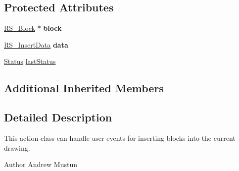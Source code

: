 \subsection*{Protected Attributes}
\begin{DoxyCompactItemize}
\item 
\hypertarget{classRS__ActionBlocksInsert_ad95c23f83966dd927d4a9e2f07f60eb1}{\hyperlink{classRS__Block}{R\-S\-\_\-\-Block} $\ast$ {\bfseries block}}\label{classRS__ActionBlocksInsert_ad95c23f83966dd927d4a9e2f07f60eb1}

\item 
\hypertarget{classRS__ActionBlocksInsert_a8eca90791fedf4424ded9fddcb26b19f}{\hyperlink{classRS__InsertData}{R\-S\-\_\-\-Insert\-Data} {\bfseries data}}\label{classRS__ActionBlocksInsert_a8eca90791fedf4424ded9fddcb26b19f}

\item 
\hyperlink{classRS__ActionBlocksInsert_ab26cc8e619eca4fac8c57f59d9698b4a}{Status} \hyperlink{classRS__ActionBlocksInsert_a1024e7457ded5c9a529c33f40a373bed}{last\-Status}
\end{DoxyCompactItemize}
\subsection*{Additional Inherited Members}


\subsection{Detailed Description}
This action class can handle user events for inserting blocks into the current drawing.

\begin{DoxyAuthor}{Author}
Andrew Mustun 
\end{DoxyAuthor}


